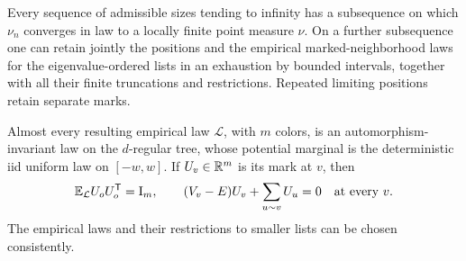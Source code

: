 \begin{proposition}\label{prop:marked-limits}
Every sequence of admissible sizes tending to infinity has a
subsequence on which \(\nu_n\) converges in law to a locally finite
point measure \(\nu\).  On a further subsequence one can retain jointly
the positions and the empirical marked-neighborhood laws for the
eigenvalue-ordered lists in an exhaustion by bounded intervals,
together with all their finite truncations and restrictions.
Repeated limiting positions retain separate marks.

Almost every resulting empirical law \(\mathcal L\), with \(m\) colors,
is an automorphism-invariant law on the \(d\)-regular tree, whose
potential marginal is the deterministic iid uniform law on
\([-w,w]\).  If \(U_v\in\mathbb R^m\) is its mark at \(v\), then
\begin{equation}\label{eq:mark-normalization-equation}
 \mathbb E_{\mathcal L}U_oU_o^{\mathsf T}=\mathrm I_m,
 \qquad
 (V_v-E)U_v+\sum_{u\sim v}U_u=0\quad\text{at every }v.
\end{equation}
The empirical laws and their restrictions to smaller lists can be
chosen consistently.
\end{proposition}

